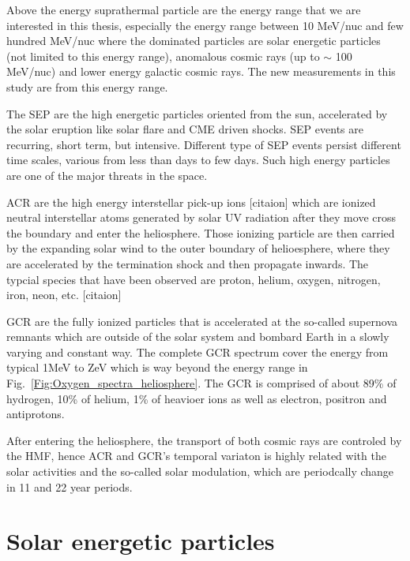 Above the energy suprathermal particle are the energy range that we are interested in this thesis, especially the energy range between 10 MeV/nuc and few hundred MeV/nuc where the dominated particles are solar energetic particles (not limited to this energy range), anomalous cosmic rays (up to $\sim$ 100 MeV/nuc) and lower energy galactic cosmic rays. The new measurements in this study are from this energy range.

The \acl{SEP} are the high energetic particles oriented from the sun, accelerated by the solar eruption like solar flare and \ac{CME} driven shocks. \acs{SEP} events are recurring, short term, but intensive. Different type of \acs{SEP} events persist different time scales, various from less than days to few days. Such high energy particles are one of the major threats in the space.

\acs{ACR} are the high energy interstellar pick-up ions [citaion] which are ionized neutral interstellar atoms generated by solar UV radiation after they move cross the boundary and enter the heliosphere. Those ionizing particle are then carried by the expanding solar wind to the outer boundary of helioesphere, where they are accelerated by the termination shock and then propagate inwards. The typcial species that have been observed are proton, helium, oxygen, nitrogen, iron, neon, etc. [citaion]

\ac{GCR} are the fully ionized particles that is accelerated at the so-called supernova remnants \cite{Blasi2013AARv2013} which are outside of the solar system and bombard Earth in a slowly varying and constant way. The complete GCR spectrum cover the energy from typical 1MeV \citet{Potgieter2013LRSP} to ZeV which is way beyond the energy range in Fig.~\ref{Fig:Oxygen_spectra_heliosphere}. The \acs{GCR} is comprised of about 89\% of hydrogen, 10\% of helium, 1\% of heavioer ions as well as electron, positron and antiprotons. 

After entering the heliosphere, the transport of both cosmic rays are controled by the \ac{HMF}, hence \ac{ACR} and \ac{GCR}'s temporal variaton is highly related with the solar activities and the so-called solar modulation, which are periodcally change in 11 and 22 year periods. 


\section{Solar energetic particles}

